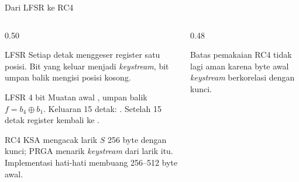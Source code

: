 \documentclass[aspectratio=169,11pt]{beamer}
\begin{document}
\begin{frame}{Dari LFSR ke RC4}
    \begin{columns}[T,onlytextwidth]
        \begin{column}{0.50\textwidth}
            \scriptsize
            \begin{block}{LFSR}
                Setiap detak menggeser register satu posisi. Bit yang keluar
                menjadi \textit{keystream}, bit umpan balik mengisi posisi
                kosong.
            \end{block}
            \begin{exampleblock}{LFSR 4 bit}
                Muatan awal , umpan balik $f=b_4\oplus b_1$.
                Keluaran 15 detak: . Setelah 15 detak
                register kembali ke .
            \end{exampleblock}
            \begin{block}{RC4}
                KSA mengacak larik $S$ 256 byte dengan kunci; PRGA menarik
                \textit{keystream} dari larik itu. Implementasi hati-hati
                membuang 256--512 byte awal.
            \end{block}
        \end{column}
        \begin{column}{0.48\textwidth}
            \centering
            \vspace{0.12cm}
            \begin{alertblock}{Batas pemakaian}
                \footnotesize
                RC4 tidak lagi aman karena byte awal \textit{keystream}
                berkorelasi dengan kunci.
            \end{alertblock}
        \end{column}
    \end{columns}
\end{frame}
\end{document}
